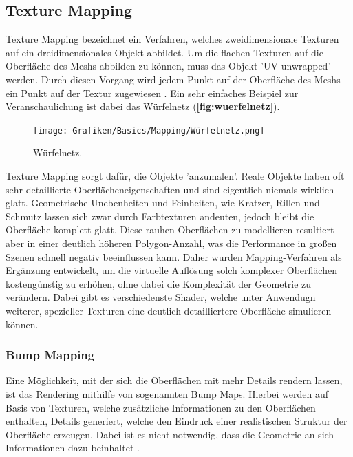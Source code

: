 \subsection{Texture Mapping}

Texture Mapping bezeichnet ein Verfahren, welches zweidimensionale Texturen auf ein dreidimensionales Objekt
abbildet. Um die flachen Texturen auf die Oberfläche des Meshs abbilden zu können, muss das Objekt 'UV-unwrapped' werden.
Durch diesen Vorgang wird jedem Punkt auf der Oberfläche des Meshs ein Punkt auf der Textur zugewiesen \parencite{Catmull1974} \parencite{Blinn1976}.
Ein sehr einfaches Beispiel zur Veranschaulichung ist dabei das Würfelnetz (\textbf{\autoref{fig:wuerfelnetz}}).
\begin{figure}[h]
	\centering
	\texttt{[image: Grafiken/Basics/Mapping/Würfelnetz.png]}
	\begin{footnotesize}
		\caption{Würfelnetz.}
		\label{fig:wuerfelnetz}
	\end{footnotesize}
\end{figure}

Texture Mapping sorgt dafür, die Objekte 'anzumalen'.
Reale Objekte haben oft sehr detaillierte Oberflächeneigenschaften und sind eigentlich niemals wirklich glatt.
Geometrische Unebenheiten und Feinheiten, wie Kratzer, Rillen und Schmutz lassen sich zwar durch 
Farbtexturen andeuten, jedoch bleibt die Oberfläche komplett glatt. Diese rauhen Oberflächen zu modellieren resultiert
aber in einer deutlich höheren Polygon-Anzahl, was die Performance in großen Szenen schnell negativ beeinflussen kann.
Daher wurden Mapping-Verfahren als Ergänzung entwickelt, um die virtuelle Auflösung
solch komplexer Oberflächen kostengünstig zu erhöhen, ohne dabei die Komplexität der Geometrie zu verändern.
Dabei gibt es verschiedenste Shader, welche unter Anwendugn weiterer, spezieller Texturen eine deutlich detailliertere
Oberfläche simulieren können.


\subsubsection{Bump Mapping}

Eine Möglichkeit, mit der sich die Oberflächen mit mehr Details rendern lassen, ist das Rendering
mithilfe von sogenannten Bump Maps.
Hierbei werden auf Basis von Texturen, welche zusätzliche Informationen zu den Oberflächen enthalten,
Details generiert, welche den Eindruck einer realistischen Struktur der Oberfläche erzeugen.
Dabei ist es nicht notwendig, dass die Geometrie an sich Informationen dazu beinhaltet \parencite{Blinn1978}.

